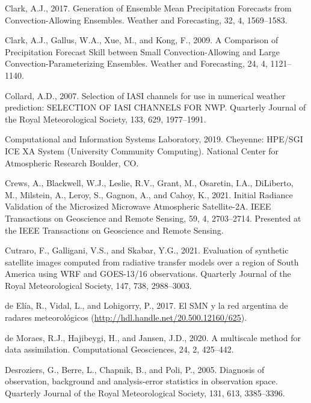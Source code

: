 \documentclass[12pt,oneside,a4paper]{reedthesis}
\begin{document}
\leavevmode\hypertarget{ref-clark2017}{}%
Clark, A.J., 2017. Generation of Ensemble Mean Precipitation Forecasts from Convection-Allowing Ensembles. Weather and Forecasting, 32, 4, 1569--1583.

\leavevmode\hypertarget{ref-clark2009}{}%
Clark, A.J., Gallus, W.A., Xue, M., and Kong, F., 2009. A Comparison of Precipitation Forecast Skill between Small Convection-Allowing and Large Convection-Parameterizing Ensembles. Weather and Forecasting, 24, 4, 1121--1140.

\leavevmode\hypertarget{ref-collard2007}{}%
Collard, A.D., 2007. Selection of IASI channels for use in numerical weather prediction: SELECTION OF IASI CHANNELS FOR NWP. Quarterly Journal of the Royal Meteorological Society, 133, 629, 1977--1991.

\leavevmode\hypertarget{ref-Cheyenne2019}{}%
Computational and Information Systems Laboratory, 2019. Cheyenne: HPE/SGI ICE XA System (University Community Computing). National Center for Atmospheric Research Boulder, CO.

\leavevmode\hypertarget{ref-crews2021}{}%
Crews, A., Blackwell, W.J., Leslie, R.V., Grant, M., Osaretin, I.A., DiLiberto, M., Milstein, A., Leroy, S., Gagnon, A., and Cahoy, K., 2021. Initial Radiance Validation of the Microsized Microwave Atmospheric Satellite-2A. IEEE Transactions on Geoscience and Remote Sensing, 59, 4, 2703--2714. Presented at the IEEE Transactions on Geoscience and Remote Sensing.

\leavevmode\hypertarget{ref-cutraro2021}{}%
Cutraro, F., Galligani, V.S., and Skabar, Y.G., 2021. Evaluation of synthetic satellite images computed from radiative transfer models over a region of South America using WRF and GOES-13/16 observations. Quarterly Journal of the Royal Meteorological Society, 147, 738, 2988--3003.

\leavevmode\hypertarget{ref-deelia2017}{}%
de Elía, R., Vidal, L., and Lohigorry, P., 2017. El SMN y la red argentina de radares meteorológicos (\url{http://hdl.handle.net/20.500.12160/625}).

\leavevmode\hypertarget{ref-demoraes2020}{}%
de Moraes, R.J., Hajibeygi, H., and Jansen, J.D., 2020. A multiscale method for data assimilation. Computational Geosciences, 24, 2, 425--442.

\leavevmode\hypertarget{ref-desroziers2005}{}%
Desroziers, G., Berre, L., Chapnik, B., and Poli, P., 2005. Diagnosis of observation, background and analysis-error statistics in observation space. Quarterly Journal of the Royal Meteorological Society, 131, 613, 3385--3396.
\end{document}
